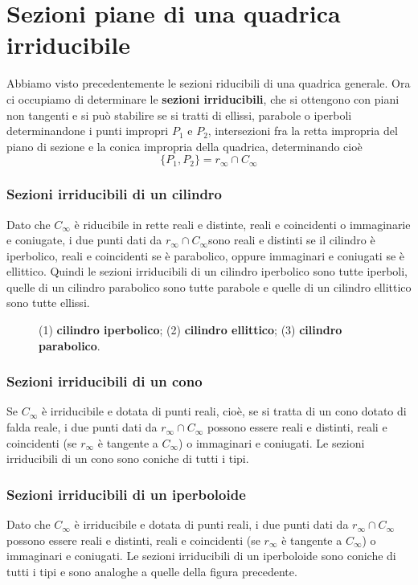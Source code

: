 \section{Sezioni piane di una quadrica irriducibile}
Abbiamo visto precedentemente le sezioni riducibili di una quadrica generale. Ora ci occupiamo di determinare le \textbf{sezioni irriducibili}, che si ottengono con piani non tangenti e si può stabilire se si tratti di ellissi, parabole o iperboli determinandone i punti impropri \(P_1\) e \(P_2\), intersezioni fra la retta impropria del piano di sezione e la conica impropria della quadrica, determinando cioè \[
\{P_1, P_2\} = r_\infty \cap C_\infty
\] 
\subsubsection{Sezioni irriducibili di un cilindro}
Dato che \(C_\infty\) è riducibile in rette reali e distinte, reali e coincidenti o immaginarie e coniugate, i due punti dati da \(r_\infty \cap C_\infty\)sono reali e distinti se il cilindro è iperbolico, reali e coincidenti se è parabolico, oppure immaginari e coniugati se è ellittico. Quindi le sezioni irriducibili di un cilindro iperbolico sono tutte iperboli, quelle di un cilindro parabolico sono tutte parabole e quelle di un cilindro ellittico sono tutte ellissi.
\vspace{10pt}
\begin{figure}[ht]
    \centering
    \def\svgwidth{400pt}
    \caption{(1) \textbf{cilindro iperbolico}; (2) \textbf{cilindro ellittico}; (3) \textbf{cilindro parabolico}.}
    \label{fig:sezioni-cilindro}
\end{figure}
\subsubsection{Sezioni irriducibili di un cono}
Se \(C_\infty\) è irriducibile e dotata di punti reali, cioè, se si tratta di un cono dotato di falda reale, i due punti dati da \(r_\infty \cap C_\infty\) possono essere reali e distinti, reali e coincidenti (se \(r_\infty\) è tangente a \(C_\infty\)) o immaginari e coniugati. Le sezioni irriducibili di un cono sono coniche di tutti i tipi.
\vspace{10pt}
\begin{figure}[ht]
    \centering
    \def\svgwidth{180pt}
    \label{fig:sezioni-cono}
\end{figure}

\subsubsection{Sezioni irriducibili di un iperboloide}
Dato che \(C_\infty\) è irriducibile e dotata di punti reali, i due punti dati da \(r_\infty \cap C_\infty\) possono essere reali e distinti, reali e coincidenti (se \(r_\infty\) è tangente a \(C_\infty\)) o immaginari e coniugati. Le sezioni irriducibili di un iperboloide sono coniche di tutti i tipi e sono analoghe a quelle della figura precedente.

